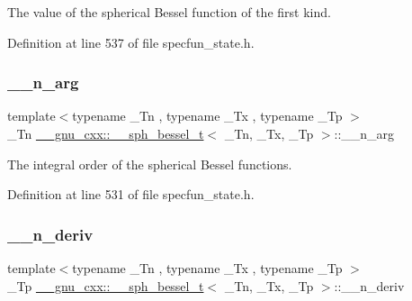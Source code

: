 The value of the spherical Bessel function of the first kind. 



Definition at line 537 of file specfun\+\_\+state.\+h.

\mbox{\label{struct____gnu__cxx_1_1____sph__bessel__t_a002325ca0f884fb872e1d211e7885d58}} 
\subsubsection{\texorpdfstring{\+\_\+\+\_\+n\+\_\+arg}{\_\_n\_arg}}
{\footnotesize\ttfamily template$<$typename \+\_\+\+Tn , typename \+\_\+\+Tx , typename \+\_\+\+Tp $>$ \\
\+\_\+\+Tn \hyperlink{struct____gnu__cxx_1_1____sph__bessel__t}{\+\_\+\+\_\+gnu\+\_\+cxx\+::\+\_\+\+\_\+sph\+\_\+bessel\+\_\+t}$<$ \+\_\+\+Tn, \+\_\+\+Tx, \+\_\+\+Tp $>$\+::\+\_\+\+\_\+n\+\_\+arg}



The integral order of the spherical Bessel functions. 



Definition at line 531 of file specfun\+\_\+state.\+h.

\mbox{\label{struct____gnu__cxx_1_1____sph__bessel__t_a84247b0cc2295f300c523d85a3cc601f}} 
\subsubsection{\texorpdfstring{\+\_\+\+\_\+n\+\_\+deriv}{\_\_n\_deriv}}
{\footnotesize\ttfamily template$<$typename \+\_\+\+Tn , typename \+\_\+\+Tx , typename \+\_\+\+Tp $>$ \\
\+\_\+\+Tp \hyperlink{struct____gnu__cxx_1_1____sph__bessel__t}{\+\_\+\+\_\+gnu\+\_\+cxx\+::\+\_\+\+\_\+sph\+\_\+bessel\+\_\+t}$<$ \+\_\+\+Tn, \+\_\+\+Tx, \+\_\+\+Tp $>$\+::\+\_\+\+\_\+n\+\_\+deriv}



